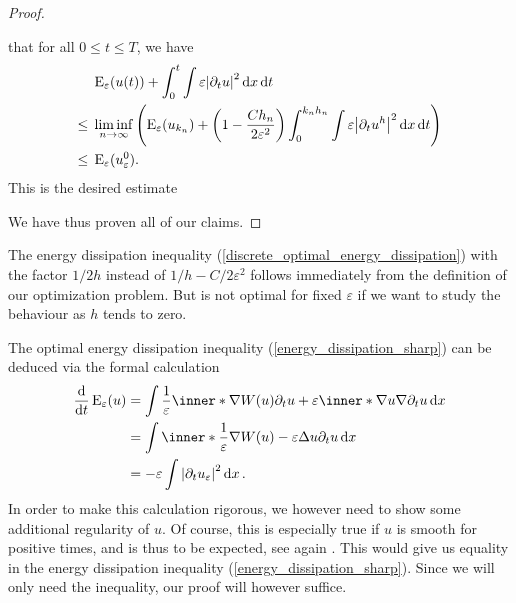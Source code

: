 \begin{proof}
\begin{description}[wide=0pt]
		that for all $ 0 \leq t \leq T $, we have
		\begin{align*}
			& \operatorname{E}_{ \varepsilon } ( u ( t ) )
			+
			\int_{ 0 }^{ t }
			\int
			\varepsilon
			\abs{ \partial_{ t } u }^{ 2 }
			\dd{ x }
			\dd{ t }
			\\
			\leq{} &
			\liminf_{ n \to \infty }
			\left(
			\operatorname{E}_{ \varepsilon } ( u_{ k_{ n } } )
			+
			\left( 1 - \frac{ C h_{ n } }{ 2 \varepsilon^{ 2 } } \right)
			\int_{ 0 }^{ k_{ n } h_{ n } }
			\int
			\varepsilon
			\abs{ \partial_{ t } u^{ h } }^{ 2 }
			\dd{ x }
			\dd{ t }
			\right)
			\\
			\leq{} &
			\operatorname{E}_{ \varepsilon } ( u_{ \varepsilon }^{ 0 } ).
		\end{align*}
		This is the desired estimate 
	\end{description}
	We have thus proven all of our claims.
\end{proof}

\begin{remark}
	The energy dissipation inequality 
	(\ref{discrete_optimal_energy_dissipation}) with the factor 
	$ 1/2h $ instead of $ 1/h- C/2\varepsilon^{ 2 } $ follows immediately from 
	the definition of our optimization problem.
	But is not optimal for fixed $ 
	\varepsilon $ if we want to study the behaviour as $ h $ tends to zero.
\end{remark}

\begin{remark}
	The optimal energy dissipation inequality (\ref{energy_dissipation_sharp}) 
	can be deduced via the formal calculation 
	\begin{align*}
		\dv{ t } \energy_{ \varepsilon } ( u )
		& =
		\int
		\frac{ 1 }{\varepsilon }
		\inner*{ \nabla W ( u ) }{ \partial_{ t } u }
		+
		\varepsilon
		\inner*{ \nabla u  }{ \nabla \partial_{ t } u }
		\dd{ x }
		\\
		& = 
		\int
		\inner*{ \frac{ 1 }{ \varepsilon } \nabla W ( u ) - \varepsilon \Delta u }{ \partial_{ t } u }
		\dd{ x }
		\\
		& =
		- \varepsilon \int \abs{ \partial_{ t } u_{ \varepsilon } }^{ 2 } \dd{ x }.
	\end{align*}
	In order to make this calculation rigorous, we however need to show some 
	additional regularity of $ u $.
	Of course, this is especially true if $ u $ is smooth for positive times, 
	and is thus to be expected, see again 
	\cite{de_mottoni_schatzmann_geometrical_evolution_of_developed_interfaces}.
	This  would give us equality in the energy dissipation inequality 
	(\ref{energy_dissipation_sharp}).
	Since we will only need the inequality, our proof will however suffice.
\end{remark}